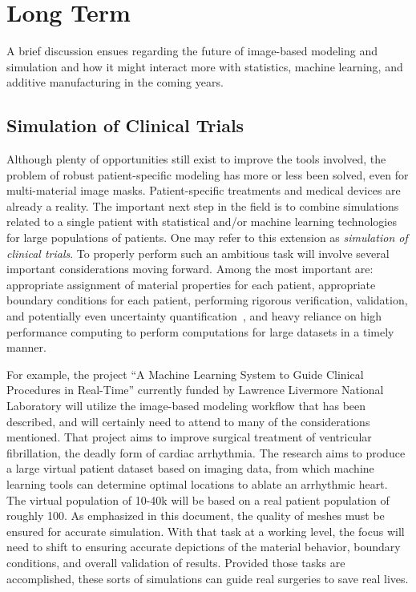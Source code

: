 \section{Long Term}
\label{Long Term}

A brief discussion ensues regarding the future of image-based modeling and simulation and how it might interact more with statistics, machine learning, and additive manufacturing in the coming years.

\subsection{Simulation of Clinical Trials}
\label{Simulation of Clinical Trials}

Although plenty of opportunities still exist to improve the tools involved, the problem of robust patient-specific modeling has more or less been solved, even for multi-material image masks. Patient-specific treatments and medical devices are already a reality. The important next step in the field is to combine simulations related to a single patient with statistical and/or machine learning technologies for large populations of patients. One may refer to this extension as \textit{simulation of clinical trials}. To properly perform such an ambitious task will involve several important considerations moving forward. Among the most important are: appropriate assignment of material properties for each patient, appropriate boundary conditions for each patient, performing rigorous verification, validation, and potentially even uncertainty quantification~\cite{NAP13395}, and heavy reliance on high performance computing to perform computations for large datasets in a timely manner.

For example, the project ``A Machine Learning System to Guide Clinical Procedures in Real-Time'' currently funded by Lawrence Livermore National Laboratory will utilize the image-based modeling workflow that has been described, and will certainly need to attend to many of the considerations mentioned. That project aims to improve surgical treatment of ventricular fibrillation, the deadly form of cardiac arrhythmia. The research aims to produce a large virtual patient dataset based on imaging data, from which machine learning tools can determine optimal locations to ablate an arrhythmic heart. The virtual population of 10-40k will be based on a real patient population of roughly 100. As emphasized in this document, the quality of meshes must be ensured for accurate simulation. With that task at a working level, the focus will need to shift to ensuring accurate depictions of the material behavior, boundary conditions, and overall validation of results. Provided those tasks are accomplished, these sorts of simulations can guide real surgeries to save real lives.

